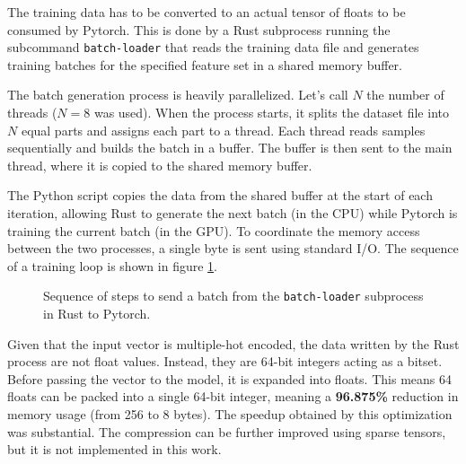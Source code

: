The training data has to be converted to an actual tensor of floats to be consumed by Pytorch. This is done by a Rust subprocess running the subcommand \texttt{batch-loader} that reads the training data file and generates training batches for the specified feature set in a shared memory buffer.

The batch generation process is heavily parallelized. Let's call $N$ the number of threads ($N=8$ was used). When the process starts, it splits the dataset file into $N$ equal parts and assigns each part to a thread. Each thread reads samples sequentially and builds the batch in a buffer. The buffer is then sent to the main thread, where it is copied to the shared memory buffer.

The Python script copies the data from the shared buffer at the start of each iteration, allowing Rust to generate the next batch (in the CPU) while Pytorch is training the current batch (in the GPU). To coordinate the memory access between the two processes, a single byte is sent using standard I/O. The sequence of a training loop is shown in figure \ref{training-loop}.

\begin{figure}[H]
\centering
{}
\caption{Sequence of steps to send a batch from the \texttt{batch-loader} subprocess in Rust to Pytorch.}
\label{training-loop}
\end{figure}

Given that the input vector is multiple-hot encoded, the data written by the Rust process are not float values. Instead, they are 64-bit integers acting as a bitset. Before passing the vector to the model, it is expanded into floats. This means 64 floats can be packed into a single 64-bit integer, meaning a \textbf{96.875\%} reduction in memory usage (from 256 to 8 bytes). The speedup obtained by this optimization was substantial. The compression can be further improved using sparse tensors, but it is not implemented in this work. \\



